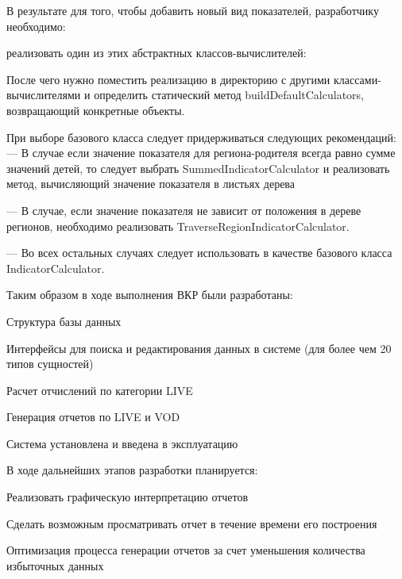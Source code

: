 \documentclass[a4paper]{article}
\begin{document}
\newpage

В результате для того, чтобы добавить новый вид показателей, разработчику необходимо:

реализовать один из этих абстрактных классов-вычислителей:


После чего нужно поместить реализацию в директорию с другими классами-вычислителями
и определить статический метод buildDefaultCalculators, возвращающий конкретные объекты.

При выборе базового класса следует придерживаться следующих рекомендаций:
--- В случае если значение показателя для региона-родителя всегда равно сумме значений детей, то следует выбрать SummedIndicatorCalculator и реализовать метод, вычисляющий значение показателя в листьях дерева

--- В случае, если значение показателя не зависит от положения в дереве регионов, необходимо реализовать TraverseRegionIndicatorCalculator.

--- Во всех остальных случаях следует использовать в качестве базового класса IndicatorCalculator.

\newpage

Таким образом в ходе выполнения ВКР были разработаны:

Структура базы данных 

Интерфейсы для поиска и редактирования данных в системе (для более чем 20 типов сущностей)

Расчет отчислений по категории LIVE

Генерация отчетов по LIVE и VOD

Система установлена и введена в эксплуатацию

\newpage
В ходе дальнейших этапов разработки планируется:

Реализовать графическую интерпретацию отчетов

Сделать возможным просматривать отчет в течение времени его построения

Оптимизация процесса генерации отчетов за счет уменьшения количества избыточных данных
\end{document}
